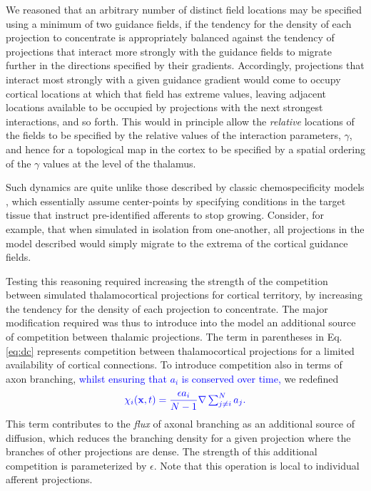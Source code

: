 \documentclass[9pt,lineno]{elife}
\newcommand{\cmnt}[1]{\textcolor{blue}{#1}}
\newcommand{\mpfive}[1]{\textcolor{revpurp2}{#1}}
\newcommand{\mb}[1]{\mathbf{#1}}
\begin{document}
\mpfive{We reasoned that an arbitrary number of distinct field locations
  may be specified using a minimum of two guidance fields, if the tendency for
  the density of each projection to concentrate is appropriately balanced
  against the tendency of projections that interact more strongly with the
  guidance fields to migrate further in the directions specified by their
  gradients. Accordingly, projections that interact most strongly with a given
  guidance gradient would come to occupy cortical locations at which that
  field has extreme values, leaving adjacent locations available to be
  occupied by projections with the next strongest interactions, and so
  forth. This would in principle allow the \emph{relative} locations of the
  fields to be specified by the relative values of the interaction parameters,
  $\gamma$, and hence for a topological map in the cortex to be specified by a
  spatial ordering of the $\gamma$ values at the level of the thalamus.}

\mpfive{Such dynamics are quite unlike those described by classic
  chemospecificity models} \citep{sperry_chemoaffinity_1963},
\mpfive{which essentially assume center-points by specifying conditions
  in the target tissue that instruct pre-identified afferents to stop
  growing. Consider, for example, that when simulated in isolation from
  one-another, all projections in the model described would simply migrate to
  the extrema of the cortical guidance fields.}

\mpfive{Testing this reasoning required increasing the strength of the
  competition between simulated thalamocortical projections for cortical
  territory, by increasing the tendency for the density of each projection to
  concentrate. The major modification required was thus to introduce into the
  model an additional source of competition between thalamic projections.}
%
The term in parentheses in Eq.\,\ref{eq:dc} represents competition between
thalamocortical projections for a limited availability of cortical
connections. To introduce competition also in terms of axon branching,
\cmnt{whilst ensuring that $a_i$ is conserved over time,} we
redefined
%
\begin{equation} \label{eq:comp}
  \color{blue}
  \chi_i(\mb{x}, t) = \frac{\epsilon a_i}{N-1} \nabla \textstyle\sum_{j\ne i}^{N}{a_j}.
  \color{black}
\end{equation}
%
\mpfive{This term contributes to the \emph{flux} of axonal branching as
  an additional source of diffusion, which reduces the branching density for a
  given projection where the branches of other projections are dense. The
  strength of this additional competition is parameterized by
  $\epsilon$}. Note that this operation is local to individual afferent
projections.
\end{document}
